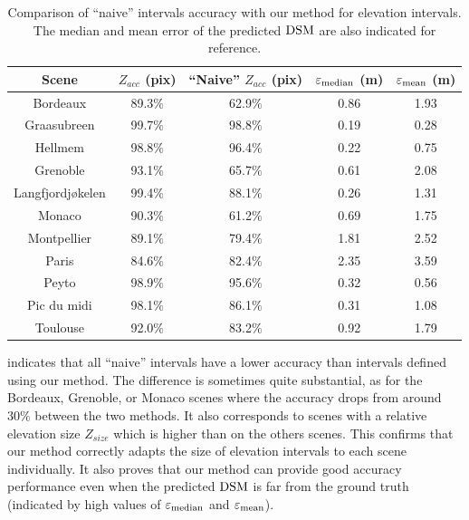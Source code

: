 \begin{table}[ht]
    \centering
    \begin{tabular}{|c||c|c|c|c|}
        \hline
        Scene & $Z_{acc}$ (pix) & ``Naive'' $Z_{acc}$ (pix) & $\varepsilon_{\operatorname*{median}}$ (m) & $\varepsilon_{\operatorname*{mean}}$ (m)
        \\\hline\hline
        Bordeaux & 89.3$\%$ & 62.9$\%$ & 0.86 & 1.93\\\hline
        Graasubreen & 99.7$\%$ & 98.8$\%$ & 0.19 & 0.28\\\hline
        Hellmem & 98.8$\%$ & 96.4$\%$ & 0.22 & 0.75\\\hline
        Grenoble & 93.1$\%$ & 65.7$\%$ & 0.61 & 2.08\\\hline
        Langfjordjøkelen & 99.4$\%$ & 88.1$\%$ & 0.26 & 1.31\\\hline
        Monaco & 90.3$\%$ & 61.2$\%$ & 0.69 & 1.75\\\hline
        Montpellier & 89.1$\%$ & 79.4$\%$ & 1.81 & 2.52\\\hline
        Paris & 84.6$\%$ & 82.4$\%$ & 2.35 & 3.59\\\hline
        Peyto & 98.9$\%$ & 95.6$\%$ & 0.32 & 0.56\\\hline
        Pic du midi & 98.1$\%$ & 86.1$\%$ & 0.31 & 1.08\\\hline
        Toulouse & 92.0$\%$ & 83.2$\%$ & 0.92 & 1.79\\\hline
    \end{tabular}
    \caption{Comparison of ``naive'' intervals accuracy with our method for elevation intervals. The median and mean error of the predicted $\mathrm{DSM}$ are also indicated for reference.}
    \label{tab:naive_accuracy}
\end{table}
 indicates that all ``naive'' intervals have a lower accuracy than intervals defined using our method. The difference is sometimes quite substantial, as for the Bordeaux, Grenoble, or Monaco scenes where the accuracy drops from around $30\%$ between the two methods. It also corresponds to scenes with a relative elevation size $Z_{size}$ which is higher than on the others scenes. This confirms that our method correctly adapts the size of elevation intervals to each scene individually. It also proves that our method can provide good accuracy performance even when the predicted $\mathrm{DSM}$ is far from the ground truth (indicated by high values of $\varepsilon_{\operatorname*{median}}$ and $\varepsilon_{\operatorname*{mean}}$). 

